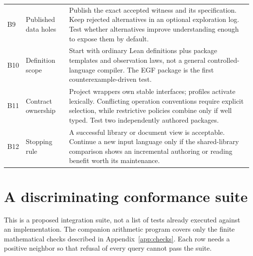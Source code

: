 \documentclass[11pt,a4paper]{article}
\theoremstyle{definition}
\begin{document}
\begin{longtable}{@{}P{.065\textwidth}P{.23\textwidth}P{.615\textwidth}@{}}
B9 & Published data holes & Publish the exact accepted witness and its specification. Keep rejected alternatives in an optional exploration log. Test whether alternatives improve understanding enough to expose them by default.\\
B10 & Definition scope & Start with ordinary Lean definitions plus package templates and observation laws, not a general controlled-language compiler. The EGF package is the first counterexample-driven test.\\
B11 & Contract ownership & Project wrappers own stable interfaces; profiles activate lexically. Conflicting operation conventions require explicit selection, while restrictive policies combine only if well typed. Test two independently authored packages.\\
B12 & Stopping rule & A successful library or document view is acceptable. Continue a new input language only if the shared-library comparison shows an incremental authoring or reading benefit worth its maintenance.\\
\bottomrule
\end{longtable}
\normalsize

\section{A discriminating conformance suite}\label{app:tests}
This is a proposed integration suite, not a list of tests already executed against
an implementation. The companion arithmetic program covers only the finite
mathematical checks described in Appendix~\ref{app:checks}. Each row needs a
positive neighbor so that refusal of every query cannot pass the suite.
\end{document}
